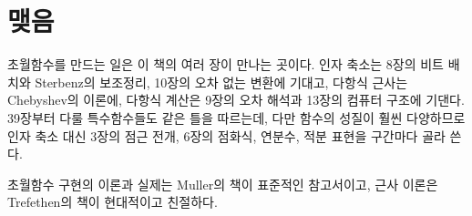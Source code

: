 \section{맺음}

초월함수를 만드는 일은 이 책의 여러 장이 만나는 곳이다. 인자 축소는 8장의 비트 배치와 Sterbenz의 보조정리, 10장의 오차 없는 변환에 기대고, 다항식 근사는 Chebyshev의 이론에, 다항식 계산은 9장의 오차 해석과 13장의 컴퓨터 구조에 기댄다. 39장부터 다룰 특수함수들도 같은 틀을 따르는데, 다만 함수의 성질이 훨씬 다양하므로 인자 축소 대신 3장의 점근 전개, 6장의 점화식, 연분수, 적분 표현을 구간마다 골라 쓴다.

초월함수 구현의 이론과 실제는 Muller의 책\cite{muller2016elementary}이 표준적인 참고서이고, 근사 이론은 Trefethen의 책\cite{trefethen2019atap}이 현대적이고 친절하다.

\chapterreferences
